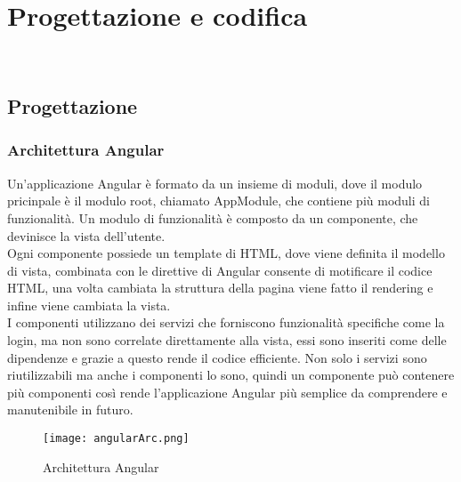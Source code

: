 
\chapter{Progettazione e codifica}
\label{cap:progettazione e codifica}

\\

\section{Progettazione}
\subsection{Architettura Angular}
Un'applicazione Angular è formato da un insieme di moduli, dove il modulo pricinpale è il modulo root, chiamato AppModule, che contiene più moduli di funzionalità. Un modulo di funzionalità è composto da un componente, che devinisce la vista dell'utente.\\
Ogni componente possiede un template di HTML, dove viene definita il modello di vista, combinata con le direttive di Angular consente di motificare il codice HTML, una volta cambiata la struttura della pagina viene fatto il rendering e infine viene cambiata la vista.\\ 
I componenti utilizzano dei servizi che forniscono funzionalità specifiche come la login, ma non sono correlate direttamente alla vista, essi sono inseriti come delle dipendenze e grazie a questo rende il codice efficiente. Non solo i servizi sono riutilizzabili ma anche i componenti lo sono, quindi un componente può contenere più componenti così rende l'applicazione Angular più semplice da comprendere e manutenibile in futuro.\\
\begin{figure}[H]
    \centering
    \texttt{[image: angularArc.png]}
    \caption{Architettura Angular}
\end{figure}
